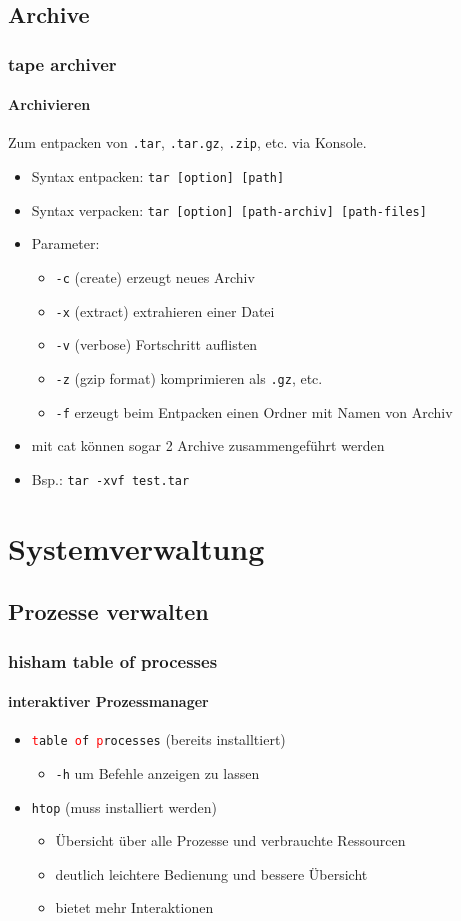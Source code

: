 \documentclass[12pt,utf8]{beamer}
\begin{document}
\subsection{Archive}
\begin{frame}
\frametitle{tape archiver}
\framesubtitle{Archivieren}
Zum entpacken von \texttt{.tar}, \texttt{.tar.gz}, \texttt{.zip}, etc. via Konsole.
\begin{itemize}
	\item Syntax entpacken: \texttt{tar [option] [path]}
	\item Syntax verpacken: \texttt{tar [option] [path-archiv] [path-files]}
	\item Parameter:
	\begin{itemize}[<+->]
		\item {\scriptsize \texttt{-c} (create) erzeugt neues Archiv}
		\item {\scriptsize \texttt{-x} (extract) extrahieren einer Datei}
		\item {\scriptsize \texttt{-v} (verbose) Fortschritt auflisten}
		\item {\scriptsize \texttt{-z} (gzip format) komprimieren als \texttt{.gz}, etc.}
		\item {\scriptsize \texttt{-f} erzeugt beim Entpacken einen Ordner mit Namen von Archiv}
	\end{itemize}
	\item {\scriptsize mit cat können sogar 2 Archive zusammengeführt werden}
	\item Bsp.: \texttt{tar -xvf test.tar}
\end{itemize}
\end{frame}

\section{Systemverwaltung}
\subsection{Prozesse verwalten}
\begin{frame}
\frametitle{hisham table of processes}
\framesubtitle{interaktiver Prozessmanager}
\begin{itemize}
	\item \texttt{\textcolor{red}{t}able \textcolor{red}{o}f \textcolor{red}{p}rocesses} (bereits installtiert)
	\begin{itemize}[<+->]
		\item {\scriptsize \texttt{-h} um Befehle anzeigen zu lassen}
	\end{itemize}
	\item \texttt{htop} (muss installiert werden)
	\begin{itemize}[<+->]
		\item {\scriptsize Übersicht über alle Prozesse und verbrauchte Ressourcen}
		\item {\scriptsize deutlich leichtere Bedienung und bessere Übersicht}
		\item {\scriptsize bietet mehr Interaktionen}
	\end{itemize}
\end{itemize}
\end{frame}
\end{document}
